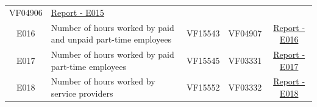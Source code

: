 \documentclass[]{book}
\begin{document}
\begin{longtable}[]{@{}clccc@{}}
\begin{minipage}[t]{0.19\columnwidth}
VF04906\strut
\end{minipage} & \begin{minipage}[t]{0.20\columnwidth}\centering
\href{./Auxiliary\%20Files/technical_reports/variable_report/E015.pdf}{Report - E015}\strut
\end{minipage}\tabularnewline
\begin{minipage}[t]{0.10\columnwidth}\centering
E016\strut
\end{minipage} & \begin{minipage}[t]{0.25\columnwidth}\raggedright
Number of hours worked by paid and unpaid part-time employees\strut
\end{minipage} & \begin{minipage}[t]{0.12\columnwidth}\centering
VF15543\strut
\end{minipage} & \begin{minipage}[t]{0.19\columnwidth}\centering
VF04907\strut
\end{minipage} & \begin{minipage}[t]{0.20\columnwidth}\centering
\href{./Auxiliary\%20Files/technical_reports/variable_report/E016.pdf}{Report - E016}\strut
\end{minipage}\tabularnewline
\begin{minipage}[t]{0.10\columnwidth}\centering
E017\strut
\end{minipage} & \begin{minipage}[t]{0.25\columnwidth}\raggedright
Number of hours worked by paid part-time employees\strut
\end{minipage} & \begin{minipage}[t]{0.12\columnwidth}\centering
VF15545\strut
\end{minipage} & \begin{minipage}[t]{0.19\columnwidth}\centering
VF03331\strut
\end{minipage} & \begin{minipage}[t]{0.20\columnwidth}\centering
\href{./Auxiliary\%20Files/technical_reports/variable_report/E017.pdf}{Report - E017}\strut
\end{minipage}\tabularnewline
\begin{minipage}[t]{0.10\columnwidth}\centering
E018\strut
\end{minipage} & \begin{minipage}[t]{0.25\columnwidth}\raggedright
Number of hours worked by service providers\strut
\end{minipage} & \begin{minipage}[t]{0.12\columnwidth}\centering
VF15552\strut
\end{minipage} & \begin{minipage}[t]{0.19\columnwidth}\centering
VF03332\strut
\end{minipage} & \begin{minipage}[t]{0.20\columnwidth}\centering
\href{./Auxiliary\%20Files/technical_reports/variable_report/E018.pdf}{Report - E018}\strut
\end{minipage}\tabularnewline
\bottomrule
\end{longtable}
\end{document}
